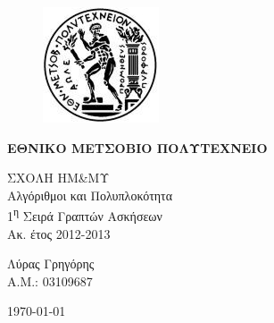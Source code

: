 \begin{titlepage}
\begin{center}
\begin{figure}[t] 
     \includegraphics[scale=0.7]{title/ntua_logo}
\end{figure}
\begin{LARGE}\textbf{ΕΘΝΙΚΟ ΜΕΤΣΟΒΙΟ ΠΟΛΥΤΕΧΝΕΙΟ\\}\end{LARGE}
\vspace{5cm}
\begin{Large}
ΣΧΟΛΗ ΗΜ\&ΜΥ\\
Αλγόριθμοι και Πολυπλοκότητα\\
1\textsuperscript{η} Σειρά Γραπτών Ασκήσεων\\
Ακ. έτος 2012-2013\\
\end{Large}
\vfill
\begin{flushright}
\Large{Λύρας Γρηγόρης}\\
\large{Α.Μ.: 03109687}\\
\end{flushright}
\large\today\\
\end{center}
\end{titlepage}

